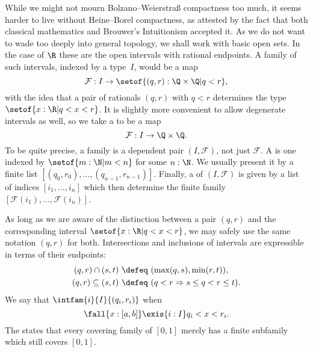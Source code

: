 While we might not mourn Bolzano--Weierstra\ss{} compactness too much, it seems harder to live
without Heine--Borel compactness, as attested by the fact that both classical mathematics
and Brouwer's Intuitionism accepted it. As we do not want to wade too deeply into general
topology, we shall work with basic open sets. In the case of $\R$ these are the open
intervals with rational endpoints. A family of such intervals, indexed by a type~$I$,
would be a map
%
\begin{equation*}
  \mathcal{F} : I \to \setof{(q, r) : \Q \times \Q | q < r},
\end{equation*}
%
with the idea that a pair of rationals $(q, r)$ with $q < r$ determines the type $\setof{ x : \R | q < x < r}$. It is slightly more convenient to allow degenerate intervals as well, so we take a
%
%
to be a map
%
\begin{equation*}
  \mathcal{F} : I \to \Q \times \Q.
\end{equation*}
%
To be quite precise, a family is a dependent pair $(I, \mathcal{F})$, not just
$\mathcal{F}$. A  is one indexed by $\setof{ m :
  \N | m < n}$ for some $n : \N$. We usually present it by a finite list $[(q_0, r_0), \ldots,
(q_{n-1}, r_{n-1})]$. Finally, a  of $(I, \mathcal{F})$ is given
by a list of indices $[i_1, \ldots, i_n]$ which then determine the finite family
$[\mathcal{F}(i_1), \ldots, \mathcal{F}(i_n)]$.

As long as we are aware of the distinction between a pair $(q, r)$ and the corresponding
interval $\setof{ x : \R | q < x < r}$, we may safely use the same notation $(q, r)$ for
both. Intersections and inclusions of intervals are expressible in terms of their
endpoints:
%
\begin{align*}
  (q, r) \cap (s, t) &\ \defeq\  (\max(q, s), \min(r, t)),\\
  (q, r) \subseteq (s, t) &\ \defeq\ (q < r \Rightarrow s \leq q < r \leq t).
\end{align*}
%
We say that $\intfam{i}{I}{(q_i, r_i)}$ 
%
%
%
when
%
\begin{equation} \label{eq:cover-pointwise-truncated}
  \fall{x : [a,b]} \exis{i : I} q_i < x < r_i.
\end{equation}
%
The 
%
states that every covering family of $[0,1]$
merely has a finite subfamily which still covers $[0,1]$.

